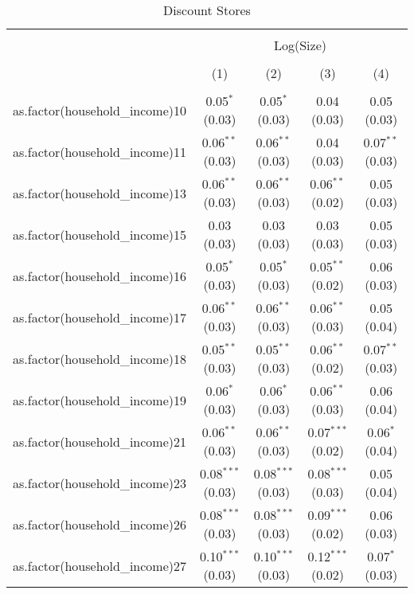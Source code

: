 
\begin{table}[!htbp] \centering 
  \caption{Discount Stores} 
  \label{tab:packageSizeDiscountTamponappendix} 
\begin{tabular}{@{\extracolsep{5pt}}lcccc} 
\\[-1.8ex]\hline 
\hline \\[-1.8ex] 
 & \multicolumn{4}{c}{Log(Size)} \\ 
\\[-1.8ex] & (1) & (2) & (3) & (4)\\ 
\hline \\[-1.8ex] 
 as.factor(household\_income)10 & 0.05$^{*}$ (0.03) & 0.05$^{*}$ (0.03) & 0.04 (0.03) & 0.05 (0.03) \\ 
  as.factor(household\_income)11 & 0.06$^{**}$ (0.03) & 0.06$^{**}$ (0.03) & 0.04 (0.03) & 0.07$^{**}$ (0.03) \\ 
  as.factor(household\_income)13 & 0.06$^{**}$ (0.03) & 0.06$^{**}$ (0.03) & 0.06$^{**}$ (0.02) & 0.05 (0.03) \\ 
  as.factor(household\_income)15 & 0.03 (0.03) & 0.03 (0.03) & 0.03 (0.03) & 0.05 (0.03) \\ 
  as.factor(household\_income)16 & 0.05$^{*}$ (0.03) & 0.05$^{*}$ (0.03) & 0.05$^{**}$ (0.02) & 0.06 (0.03) \\ 
  as.factor(household\_income)17 & 0.06$^{**}$ (0.03) & 0.06$^{**}$ (0.03) & 0.06$^{**}$ (0.03) & 0.05 (0.04) \\ 
  as.factor(household\_income)18 & 0.05$^{**}$ (0.03) & 0.05$^{**}$ (0.03) & 0.06$^{**}$ (0.02) & 0.07$^{**}$ (0.03) \\ 
  as.factor(household\_income)19 & 0.06$^{*}$ (0.03) & 0.06$^{*}$ (0.03) & 0.06$^{**}$ (0.03) & 0.06 (0.04) \\ 
  as.factor(household\_income)21 & 0.06$^{**}$ (0.03) & 0.06$^{**}$ (0.03) & 0.07$^{***}$ (0.02) & 0.06$^{*}$ (0.04) \\ 
  as.factor(household\_income)23 & 0.08$^{***}$ (0.03) & 0.08$^{***}$ (0.03) & 0.08$^{***}$ (0.03) & 0.05 (0.04) \\ 
  as.factor(household\_income)26 & 0.08$^{***}$ (0.03) & 0.08$^{***}$ (0.03) & 0.09$^{***}$ (0.02) & 0.06 (0.03) \\ 
  as.factor(household\_income)27 & 0.10$^{***}$ (0.03) & 0.10$^{***}$ (0.03) & 0.12$^{***}$ (0.02) & 0.07$^{*}$ (0.03) \\ 

\end{tabular}
\end{table}
